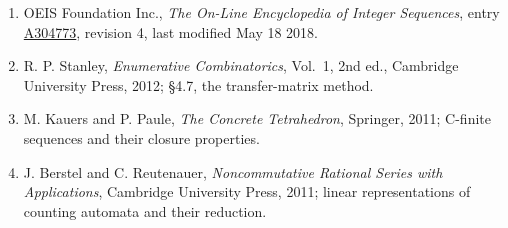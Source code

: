 \documentclass[11pt]{article}
\theoremstyle{definition}
\begin{document}
\begin{enumerate}

\item OEIS Foundation Inc., \emph{The On-Line Encyclopedia of Integer Sequences}, entry \href{https://oeis.org/A304773}{A304773}, revision 4, last modified May 18 2018.

\item R. P. Stanley, \emph{Enumerative Combinatorics}, Vol.~1, 2nd ed., Cambridge University Press, 2012; \S4.7, the transfer-matrix method.

\item M. Kauers and P. Paule, \emph{The Concrete Tetrahedron}, Springer, 2011; C-finite sequences and their closure properties.

\item J. Berstel and C. Reutenauer, \emph{Noncommutative Rational Series with Applications}, Cambridge University Press, 2011; linear representations of counting automata and their reduction.

\end{enumerate}
\end{document}
